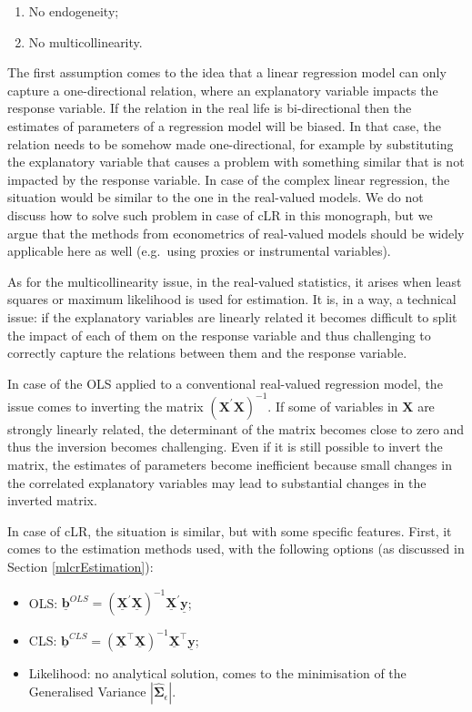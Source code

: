 \documentclass[
]{book}
\providecommand{\tightlist}{%
  \setlength{\itemsep}{0pt}\setlength{\parskip}{0pt}}
\begin{document}
\begin{enumerate}
\def\labelenumi{\arabic{enumi}.}
\tightlist
\item
  No endogeneity;
\item
  No multicollinearity.
\end{enumerate}

The first assumption comes to the idea that a linear regression model can only capture a one-directional relation, where an explanatory variable impacts the response variable. If the relation in the real life is bi-directional then the estimates of parameters of a regression model will be biased. In that case, the relation needs to be somehow made one-directional, for example by substituting the explanatory variable that causes a problem with something similar that is not impacted by the response variable. In case of the complex linear regression, the situation would be similar to the one in the real-valued models. We do not discuss how to solve such problem in case of cLR in this monograph, but we argue that the methods from econometrics of real-valued models should be widely applicable here as well (e.g.~using proxies or instrumental variables).

As for the multicollinearity issue, in the real-valued statistics, it arises when least squares or maximum likelihood is used for estimation. It is, in a way, a technical issue: if the explanatory variables are linearly related it becomes difficult to split the impact of each of them on the response variable and thus challenging to correctly capture the relations between them and the response variable.

In case of the OLS applied to a conventional real-valued regression model, the issue comes to inverting the matrix \(\left( {\mathbf{X}}^\prime {\mathbf{X}} \right)^{-1}\). If some of variables in \(\mathbf{X}\) are strongly linearly related, the determinant of the matrix becomes close to zero and thus the inversion becomes challenging. Even if it is still possible to invert the matrix, the estimates of parameters become inefficient because small changes in the correlated explanatory variables may lead to substantial changes in the inverted matrix.

In case of cLR, the situation is similar, but with some specific features. First, it comes to the estimation methods used, with the following options (as discussed in Section \ref{mlcrEstimation}):

\begin{itemize}
\tightlist
\item
  OLS: \(\underline{\boldsymbol{b}}^{OLS} = \left( \underline{\mathbf{X}}^\prime \underline{\mathbf{X}} \right)^{-1} \underline{\mathbf{X}}^\prime \underline{\mathbf{y}}\);
\item
  CLS: \(\underline{\boldsymbol{b}}^{CLS} = \left( \underline{\mathbf{X}}^\top \underline{\mathbf{X}}\right)^{-1} \underline{\mathbf{X}}^\top \underline{\mathbf{y}}\);
\item
  Likelihood: no analytical solution, comes to the minimisation of the Generalised Variance \(|\hat{\boldsymbol{\Sigma}}_\epsilon|\).
\end{itemize}
\end{document}
